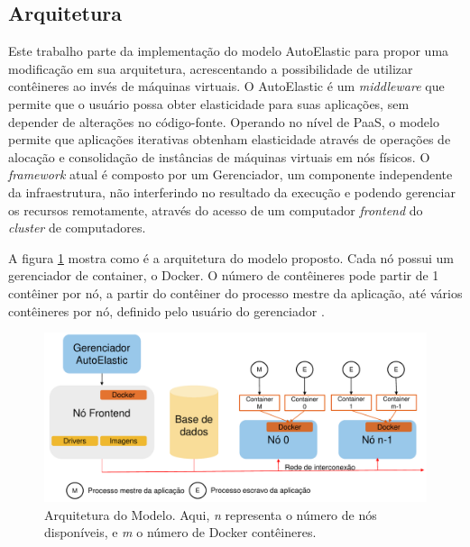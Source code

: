 \documentclass[twoside,english,brazilian]{UNISINOSartigo}
\begin{document}
\subsection{Arquitetura}
\label{arquitetura}
Este trabalho parte da implementação do modelo AutoElastic para propor uma modificação em sua arquitetura, acrescentando a possibilidade de utilizar contêineres ao invés de máquinas virtuais. O AutoElastic é um \textit{middleware} que permite que o usuário possa obter elasticidade para suas aplicações, sem depender de alterações no código-fonte. Operando no nível de PaaS, o modelo permite que aplicações iterativas obtenham elasticidade através de operações de alocação e consolidação de instâncias de máquinas virtuais em nós físicos. O \textit{framework} atual é composto por um Gerenciador, um componente independente da infraestrutura, não interferindo no resultado da execução e podendo gerenciar os recursos remotamente, através do acesso de um computador \textit{frontend} do \textit{cluster} de computadores.

A figura \ref{fig:arquitetura} mostra como é a arquitetura do modelo proposto. Cada nó possui um gerenciador de container, o Docker. O número de contêineres pode partir de 1 contêiner por nó, a partir do contêiner do processo mestre da aplicação, até vários contêineres por nó, definido pelo usuário do gerenciador \cite{6307065}.

\begin{figure}
	\caption{Arquitetura do Modelo. Aqui, \textit{n} representa o número de nós disponíveis, e \textit{m} o número de Docker contêineres.}
	\label{fig:arquitetura}
	\centering%
	\vspace{-0.5\baselineskip}
	\begin{minipage}{0.8\textwidth}
		\includegraphics[width=\textwidth]{images/arquitetura}
	\end{minipage}
\end{figure}
\end{document}
